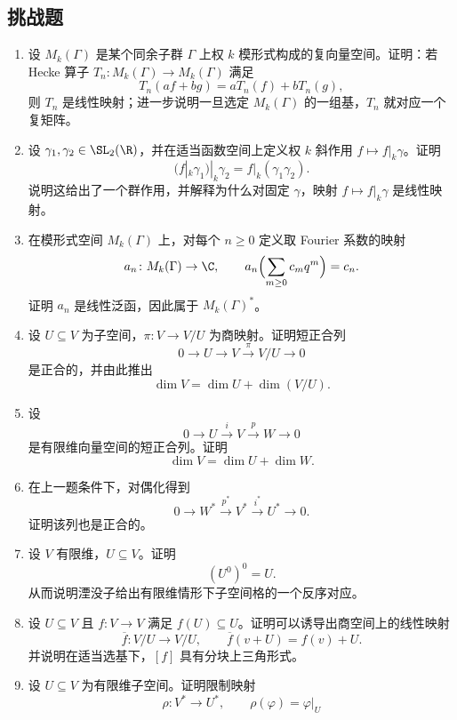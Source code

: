 \subsection*{挑战题}

\begin{enumerate}[label=\textbf{\arabic*.}, leftmargin=3.5em, start=56]
  \item {\hard} 设 $M_k(\Gamma)$ 是某个同余子群 $\Gamma$ 上权 $k$ 模形式构成的复向量空间。证明：若 Hecke 算子 $T_n\colon M_k(\Gamma)\to M_k(\Gamma)$ 满足
  \[
    T_n(af+bg)=aT_n(f)+bT_n(g),
  \]
  则 $T_n$ 是线性映射；进一步说明一旦选定 $M_k(\Gamma)$ 的一组基，$T_n$ 就对应一个复矩阵。
  \item {\hard} 设 $\gamma_1,\gamma_2\in \SL_2(\R)$，并在适当函数空间上定义权 $k$ 斜作用 $f\mapsto f|_k\gamma$。证明
  \[
    (f|_k\gamma_1)|_k\gamma_2=f|_k(\gamma_1\gamma_2).
  \]
  说明这给出了一个群作用，并解释为什么对固定 $\gamma$，映射 $f\mapsto f|_k\gamma$ 是线性映射。
  \item {\hard} 在模形式空间 $M_k(\Gamma)$ 上，对每个 $n\ge 0$ 定义取 Fourier 系数的映射
  \[
    a_n\colon M_k(\Gamma)\to \C,
    \qquad
    a_n\Bigl(\sum_{m\ge 0} c_m q^m\Bigr)=c_n.
  \]
  证明 $a_n$ 是线性泛函，因此属于 $M_k(\Gamma)^*$。
  \item {\hard} 设 $U\subseteq V$ 为子空间，$\pi\colon V\to V/U$ 为商映射。证明短正合列
  \[
    0\longrightarrow U\longrightarrow V\overset{\pi}{\longrightarrow} V/U\longrightarrow 0
  \]
  是正合的，并由此推出
  \[
    \dim V=\dim U+\dim(V/U).
  \]
  \item {\hard} 设
  \[
    0\longrightarrow U\overset{i}{\longrightarrow} V\overset{p}{\longrightarrow} W\longrightarrow 0
  \]
  是有限维向量空间的短正合列。证明
  \[
    \dim V=\dim U+\dim W.
  \]
  \item {\hard} 在上一题条件下，对偶化得到
  \[
    0\longrightarrow W^*\overset{p^*}{\longrightarrow} V^*\overset{i^*}{\longrightarrow} U^*\longrightarrow 0.
  \]
  证明该列也是正合的。
  \item {\hard} 设 $V$ 有限维，$U\subseteq V$。证明
  \[
    (U^0)^0=U.
  \]
  从而说明湮没子给出有限维情形下子空间格的一个反序对应。
  \item {\hard} 设 $U\subseteq V$ 且 $f\colon V\to V$ 满足 $f(U)\subseteq U$。证明可以诱导出商空间上的线性映射
  \[
    \overline f\colon V/U\to V/U,
    \qquad
    \overline f(v+U)=f(v)+U.
  \]
  并说明在适当选基下，$[f]$ 具有分块上三角形式。
  \item {\hard} 设 $U\subseteq V$ 为有限维子空间。证明限制映射
  \[
    \rho\colon V^*\to U^*,\qquad \rho(\varphi)=\varphi|_U
\]
\end{enumerate}

